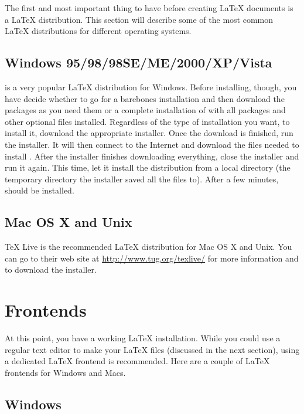 The first and most important thing to have before creating \LaTeX{}
documents is a \LaTeX{} distribution.  This section will describe some
of the most common \LaTeX{} distributions for different operating
systems.

\subsection{Windows 95/98/98SE/ME/2000/XP/Vista}
\label{sec:wind-959898s}

\href{http://www.miktex.org}{\MiKTeX{}} is a very popular \LaTeX{}
distribution for Windows.  Before installing, though, you have decide
whether to go for a barebones \MiKTeX{} installation and then download
the packages as you need them or a complete installation of \MiKTeX{}
with all packages and other optional files installed.  Regardless of
the type of installation you want, to install it, download the
appropriate installer.  Once the download is finished, run the
installer.  It will then connect to the Internet and download the
files needed to install \MiKTeX{}.  After the installer finishes
downloading everything, close the installer and run it again.  This
time, let it install the distribution from a local directory (the
temporary directory the installer saved all the files to).  After a
few minutes, \MiKTeX{} should be installed.

\subsection{Mac OS X and Unix}
\label{sec:mac-os-x}

\TeX{} Live is the recommended \LaTeX{} distribution for Mac OS X and
Unix.  You can go to their web site at
\url{http://www.tug.org/texlive/} for more information and to download
the installer.

\section{Frontends}
\label{sec:frontends}

At this point, you have a working \LaTeX{} installation.  While you
could use a regular text editor to make your \LaTeX{} files (discussed
in the next section), using a dedicated \LaTeX{} frontend is
recommended.  Here are a couple of \LaTeX{} frontends for Windows and
Macs.

\subsection{Windows}
\label{sec:windows}

